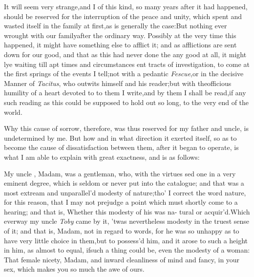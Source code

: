 \documentclass{article}
\begin{document}
It will seem very strange,\tsh and I\break 
{}
of this kind, so many years after it had happened,
should be reserved for the interruption of the peace and unity,
which 
spent and wasted itself in the family at
first,\tsk as is generally the case:\tsk But nothing ever
wrought with our family\break after the ordinary way. Possibly at the
very time this happened, it might have 
something else to afflict it; and as afflictions
are sent down for our good, and that as this
had never done the 
any good at all, it might lye\break
waiting till apt times and circumstances 
ent tracts of investigation, to come at
the first springs of the events I tell;\tsk\break not with a pedantic
\textit{Fescue},\tsk or in the decisive Manner of \textit{Tacitus},
who outwits himself and his reader;\tsk but with the\break officious
humility of a heart devoted to 
to them I write,\tsh and by them I
shall be read,\tsh if any such reading as this could be
supposed to hold out so long,\break
to the very end of the
world.\\\eject

Why this cause of sorrow, therefore, was thus reserved for my
father and uncle, is undetermined by me. But how and in what
direction it exerted itself, so as to become the cause of
dissatisfaction between them, after it began to operate, is what I
am able to explain with great exactness, and is as follows:

My uncle , Madam, was a
gentleman, who, with the virtues 
sed one in a very eminent degree,
which is seldom or never put into the catalogue; and that was a
most extream and unparallel’d modesty of
nature;\tsh tho’ I correct the word nature, for this
reason, that I may not prejudge a point which must shortly come to
a hearing; and that is, Whether this modesty of his was na- tural or
acquir’d.\tsh Which ever\break way my uncle \textit{Toby}
came by it, ’twas nevertheless modesty in the truest sense of
it; and that is, Madam, not in regard to words, for he was so
unhappy as to have very little choice in them,\tsk but to
possess’d him, and
it arose to such a height in him, as almost to equal, if\break such a
thing could be, even the modesty of a woman: That female nicety,
Madam, and inward cleanliness of mind and fancy, in your sex, which
makes you so much the awe of ours.
\end{document}
